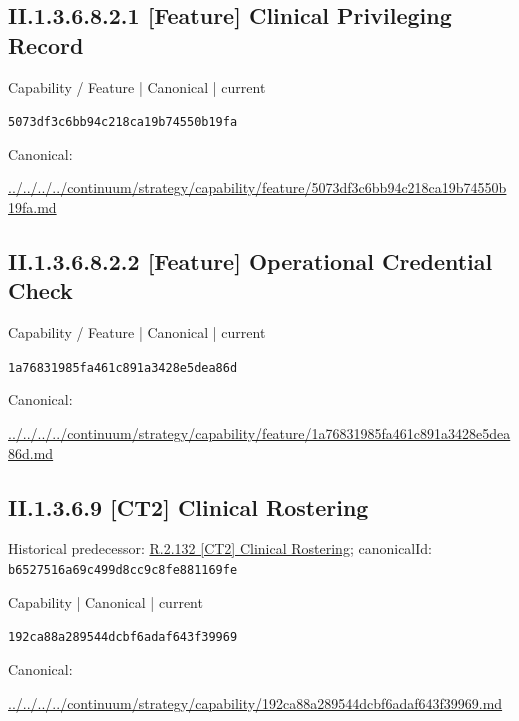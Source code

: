 \documentclass[10pt,a4paper]{article}
\begin{document}
\subsection*{II.1.3.6.8.2.1 [Feature] Clinical Privileging Record}
\label{element-5073df3c6bb94c218ca19b74550b19fa}
{\small Capability / Feature | Canonical | current}\par
\texttt{5073df3c6bb94c218ca19b74550b19fa}\par
Canonical: \par
{\footnotesize\url{../../../../continuum/strategy/capability/feature/5073df3c6bb94c218ca19b74550b19fa.md}}\par
\subsection*{II.1.3.6.8.2.2 [Feature] Operational Credential Check}
\label{element-1a76831985fa461c891a3428e5dea86d}
{\small Capability / Feature | Canonical | current}\par
\texttt{1a76831985fa461c891a3428e5dea86d}\par
Canonical: \par
{\footnotesize\url{../../../../continuum/strategy/capability/feature/1a76831985fa461c891a3428e5dea86d.md}}\par
\subsection*{II.1.3.6.9 [CT2] Clinical Rostering}
Historical predecessor: \hyperref[element-b6527516a69c499d8cc9c8fe881169fe]{R.2.132 [CT2] Clinical Rostering}; canonicalId: \texttt{b6527516a69c499d8cc9c8fe881169fe}\par
\label{element-192ca88a289544dcbf6adaf643f39969}
{\small Capability | Canonical | current}\par
\texttt{192ca88a289544dcbf6adaf643f39969}\par
Canonical: \par
{\footnotesize\url{../../../../continuum/strategy/capability/192ca88a289544dcbf6adaf643f39969.md}}\par
\end{document}
